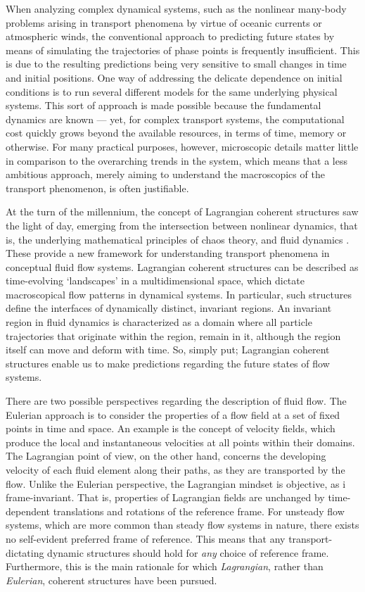 When analyzing complex dynamical systems, such as the nonlinear many-body
problems arising in transport phenomena by virtue of oceanic currents or
atmospheric winds, the conventional approach to predicting future states
by means of simulating the trajectories of phase points is frequently
insufficient. This is due to the resulting predictions being very sensitive to
small changes in time and initial positions. One way of addressing the delicate
dependence on initial conditions is to run several different models for the same
underlying physical systems. This sort of approach is made possible because
the fundamental dynamics are known --- yet, for complex transport systems,
the computational cost quickly grows beyond the available resources, in terms
of time, memory or otherwise. For many practical purposes, however, microscopic
details matter little in comparison to the overarching trends in the system,
which means that a less ambitious approach, merely aiming to understand the
macroscopics of the transport phenomenon, is often justifiable.

At the turn of the millennium, the concept of Lagrangian coherent structures
saw the light of day, emerging from the intersection between nonlinear dynamics,
that is, the underlying mathematical principles of chaos theory, and fluid
dynamics \parencite{haller2000lagrangian}. These provide a new framework for
understanding transport phenomena in conceptual fluid flow systems. Lagrangian
coherent structures can be described as time-evolving `landscapes' in a
multidimensional space, which dictate macroscopical flow patterns in dynamical
systems. In particular, such structures define the interfaces of dynamically
distinct, invariant regions. An invariant region in fluid dynamics is
characterized as a domain where all particle trajectories that originate within
the region, remain in it, although the region itself can move and deform with
time. So, simply put; Lagrangian coherent structures enable us to make
predictions regarding the future states of flow systems.

There are two possible perspectives regarding the description of fluid flow.
The Eulerian approach is to consider the properties of a flow field at a set of
fixed points in time and space. An example is the concept of velocity fields,
which produce the local and instantaneous velocities at all points within their
domains. The Lagrangian point of view, on the other hand, concerns the
developing velocity of each fluid element along their paths, as they are
transported by the flow. Unlike the Eulerian perspective, the Lagrangian
mindset is objective, as i frame-invariant. That is, properties of Lagrangian
fields are unchanged by time-dependent translations and rotations of the
reference frame. For unsteady flow systems, which are more common than steady
flow systems in nature, there exists no self-evident preferred frame of
reference. This means that any transport-dictating dynamic structures should
hold for \emph{any} choice of reference frame. Furthermore, this is the main
rationale for which \emph{Lagrangian}, rather than \emph{Eulerian}, coherent
structures have been pursued.

